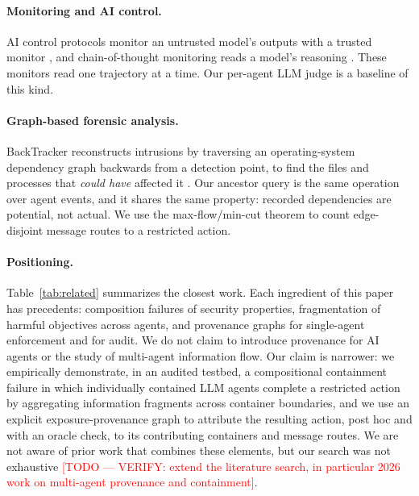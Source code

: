 \documentclass[11pt, a4paper]{article}
\newcommand{\todo}[1]{\textcolor{red}{[TODO --- #1]}}
\theoremstyle{definition}
\begin{document}
\paragraph{Monitoring and AI control.} AI control protocols monitor an untrusted model's outputs with a trusted monitor \citep{greenblatt2024control}, and chain-of-thought monitoring reads a model's reasoning \citep{baker2025monitoring}. These monitors read one trajectory at a time. Our per-agent LLM judge is a baseline of this kind.

\paragraph{Graph-based forensic analysis.} BackTracker reconstructs intrusions by traversing an operating-system dependency graph backwards from a detection point, to find the files and processes that \emph{could have} affected it \citep{king2003backtracking}. Our ancestor query is the same operation over agent events, and it shares the same property: recorded dependencies are potential, not actual. We use the max-flow/min-cut theorem \citep{ford1956} to count edge-disjoint message routes to a restricted action.

\paragraph{Positioning.} Table~\ref{tab:related} summarizes the closest work. Each ingredient of this paper has precedents: composition failures of security properties, fragmentation of harmful objectives across agents, and provenance graphs for single-agent enforcement and for audit. We do not claim to introduce provenance for AI agents or the study of multi-agent information flow. Our claim is narrower: we empirically demonstrate, in an audited testbed, a compositional containment failure in which individually contained LLM agents complete a restricted action by aggregating information fragments across container boundaries, and we use an explicit exposure-provenance graph to attribute the resulting action, post hoc and with an oracle check, to its contributing containers and message routes. We are not aware of prior work that combines these elements, but our search was not exhaustive \todo{VERIFY: extend the literature search, in particular 2026 work on multi-agent provenance and containment}.
\end{document}
